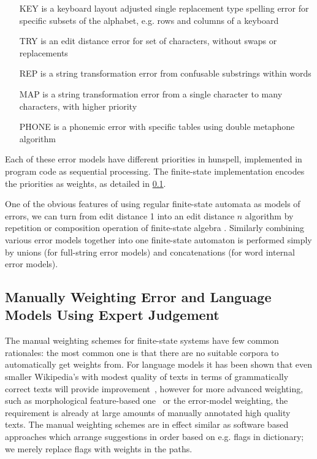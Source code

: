 \documentclass[a4paper,12pt]{article}
\begin{document}
\begin{itemize}
    \item[KEY] is a keyboard layout adjusted single replacement type spelling
        error for specific subsets of the alphabet, e.g. rows and columns of a
        keyboard
    \item[TRY] is an edit distance error for set of characters, without swaps
        or replacements
    \item[REP] is a string transformation error from confusable substrings
        within words
    \item[MAP] is a string transformation error from a single character to 
        many characters, with higher priority
    \item[PHONE] is a phonemic error with specific tables using double
        metaphone algorithm
\end{itemize}

Each of these error models have different priorities in hunspell, implemented
in program code as sequential processing. The finite-state implementation
encodes the priorities as weights, as detailed in
\ref{subsec:manual-weighting}.

One of the obvious features of using regular finite-state automata as models of
errors, we can turn from edit distance 1 into an edit distance $n$ algorithm by
repetition or composition operation of finite-state
algebra \cite[]{pirinen2012effects}.  Similarly combining various error models
together into one finite-state automaton is performed simply by unions (for
full-string error models) and concatenations (for word internal error models).

\subsection{Manually Weighting Error and Language Models Using Expert
Judgement}
\label{subsec:manual-weighting}


The manual weighting schemes for finite-state systems have few common
rationales: the most common one is that there are no suitable corpora to
automatically get weights from. For language models it has been shown that even
smaller Wikipedia's with modest quality of texts in terms of grammatically
correct texts will provide improvement~\cite[]{pirinen/2010/lrec}, however for
more advanced weighting, such as morphological feature-based
one~\cite[]{pirinen2012improving} or the error-model weighting, the requirement
is already at large amounts of manually annotated high quality texts. The
manual weighting schemes are in effect similar as software based approaches
which arrange suggestions in order based on e.g. flags in dictionary; we
merely replace flags with weights in the paths.
\end{document}
